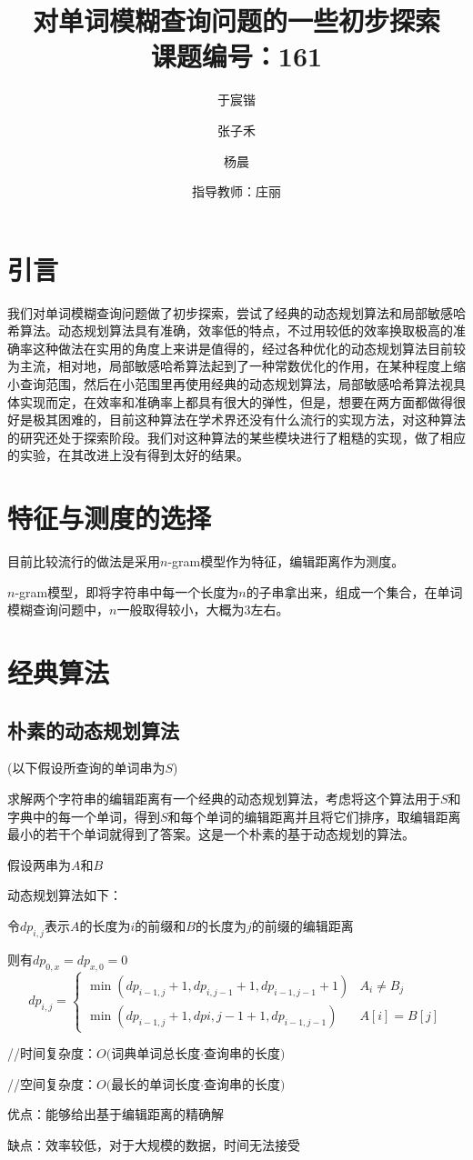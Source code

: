 \documentclass{article}
\begin{document}
	\title{对单词模糊查询问题的一些初步探索\\ 课题编号：161}
	\author{于宸锴\and 张子禾 \and 杨晨\and 指导教师：庄丽}
	\maketitle
	\section{引言}
	我们对单词模糊查询问题做了初步探索，尝试了经典的动态规划算法和局部敏感哈希算法。动态规划算法具有准确，效率低的特点，不过用较低的效率换取极高的准确率这种做法在实用的角度上来讲是值得的，经过各种优化的动态规划算法目前较为主流，相对地，局部敏感哈希算法起到了一种常数优化的作用，在某种程度上缩小查询范围，然后在小范围里再使用经典的动态规划算法，局部敏感哈希算法视具体实现而定，在效率和准确率上都具有很大的弹性，但是，想要在两方面都做得很好是极其困难的，目前这种算法在学术界还没有什么流行的实现方法，对这种算法的研究还处于探索阶段。我们对这种算法的某些模块进行了粗糙的实现，做了相应的实验，在其改进上没有得到太好的结果。
	\section{特征与测度的选择}
	目前比较流行的做法是采用$n$-gram模型作为特征，编辑距离作为测度。
	\par $n$-gram模型，即将字符串中每一个长度为$n$的子串拿出来，组成一个集合，在单词模糊查询问题中，$n$一般取得较小，大概为$3$左右。
	\section{经典算法}
	\subsection{朴素的动态规划算法}
	(以下假设所查询的单词串为$S$)
	\par 求解两个字符串的编辑距离有一个经典的动态规划算法，考虑将这个算法用于$S$和字典中的每一个单词，得到$S$和每个单词的编辑距离并且将它们排序，取编辑距离最小的若干个单词就得到了答案。这是一个朴素的基于动态规划的算法。
	\par 假设两串为$A$和$B$
	\par 动态规划算法如下：
	\par 令$dp_{i,j}$表示$A$的长度为$i$的前缀和$B$的长度为$j$的前缀的编辑距离
	\par 则有$dp_{0,x} = dp_{x,0} = 0$
	\begin{displaymath}
		dp_{i,j} = \left\{
		\begin{array}{ll}
			\min(dp_{i-1,j}+1,dp_{i,j-1}+1,dp_{i-1,j-1}+1) & A_i\neq B_j \\
			\min(dp_{i-1,j}+1,dp{i,j-1}+1,dp_{i-1,j-1}) & A[i]=B[j] 
		\end{array}
		\right.
		\end{displaymath}
		\par //时间复杂度：$O($词典单词总长度$\cdot$查询串的长度$)$
		\par //空间复杂度：$O($最长的单词长度$\cdot$查询串的长度$)$
		\par 优点：能够给出基于编辑距离的精确解
		\par 缺点：效率较低，对于大规模的数据，时间无法接受
\end{document}
